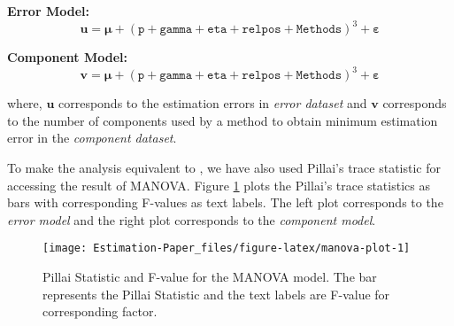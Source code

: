 \documentclass[12pt,3p,authoryear]{elsarticle}
\begin{document}
\textbf{Error Model:}
\begin{equation}
  \mathbf{u} = \boldsymbol{\mu} +
  (\texttt{p} + \texttt{gamma} + \texttt{eta} +
    \texttt{relpos} + \texttt{Methods})^3 +
    \boldsymbol{\varepsilon}
  \label{eq:err-model}
\end{equation}

\textbf{Component Model:}
\begin{equation}
  \mathbf{v} = \boldsymbol{\mu} +
  (\texttt{p} + \texttt{gamma} + \texttt{eta} +
    \texttt{relpos} + \texttt{Methods})^3 +
    \boldsymbol{\varepsilon}
  \label{eq:comp-model}
\end{equation}

where, \(\mathbf{u}\) corresponds to the estimation errors in \emph{error dataset} and \(\mathbf{v}\) corresponds to the number of components used by a method to obtain minimum estimation error in the \emph{component dataset}.

To make the analysis equivalent to \citet{rimal2019pred}, we have also used Pillai's trace statistic for accessing the result of MANOVA. Figure \ref{fig:manova-plot} plots the Pillai's trace statistics as bars with corresponding F-values as text labels. The left plot corresponds to the \emph{error model} and the right plot corresponds to the \emph{component model}.



\begin{figure}
\texttt{[image: Estimation-Paper\_files/figure-latex/manova-plot-1]} \caption{Pillai Statistic and F-value for the MANOVA model. The bar represents the Pillai Statistic and the text labels are F-value for corresponding factor.}\label{fig:manova-plot}
\end{figure}
\end{document}
